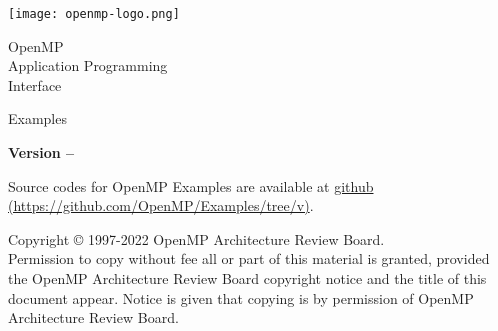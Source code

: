 
  \begin{titlepage}
    \begin{flushleft}
     \hspace{-6em} \texttt{[image: openmp-logo.png]}
    \end{flushleft}

    \begin{adjustwidth}{-0.75in}{0in}
    \begin{center}
      \Huge
      \textsf{OpenMP\\Application Programming\\Interface}

      \vspace{0.5in}\textsf{Examples}\vspace{-0.7in}
      \normalsize

      \vspace{1.0in}

      \textbf{Version \PVER{} -- \VERDATE}
    \end{center}
    \end{adjustwidth}

    \vspace{2.3in} %

Source codes for OpenMP \VER{} Examples are available at
 \href{https://github.com/OpenMP/Examples/tree/v\VER}%
 {github (https://github.com/OpenMP/Examples/tree/v\VER)}.\\

\begin{adjustwidth}{0pt}{1em}\setlength{\parskip}{0.25\baselineskip}%
Copyright \copyright{} 1997-2022 OpenMP Architecture Review Board.\\
Permission to copy without fee all or part of this material is granted,
provided the OpenMP Architecture Review Board copyright notice and
the title of this document appear. Notice is given that copying is by
permission of OpenMP Architecture Review Board.\end{adjustwidth}

  \end{titlepage}





